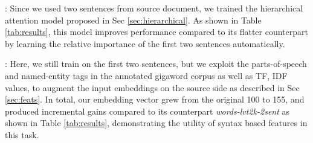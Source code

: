

:  Since we used two sentences from source document, we trained the hierarchical attention model proposed in Sec \ref{sec:hierarchical}. As shown in Table \ref{tab:results}, this model improves performance compared to its flatter counterpart by learning the relative importance of the first two sentences automatically. %


:  Here, we still train on the first two sentences, but we exploit the parts-of-speech and named-entity tags in the annotated gigaword corpus as well as TF, IDF values, to augment the input embeddings on the source side as described in Sec \ref{sec:feats}.
In total, our embedding vector grew from the original 100 to 155, and produced incremental gains compared to its counterpart {\it words-lvt2k-2sent} as shown in Table \ref{tab:results}, demonstrating the utility of syntax based features in this task. 


